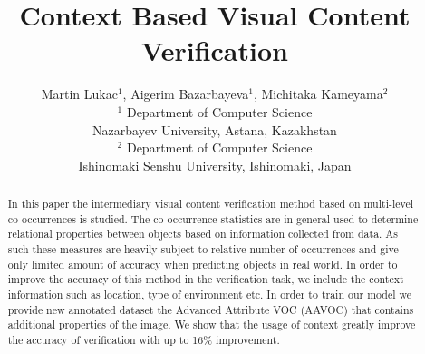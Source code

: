 \documentclass[conference]{IEEEtran}
\begin{document}
\title{Context Based Visual Content Verification}

\author{Martin Lukac$^1$, Aigerim Bazarbayeva$^1$, Michitaka Kameyama$^2$\\ 
$^1$ Department of Computer Science\\ Nazarbayev University, Astana, Kazakhstan\\
$^2$ Department of Computer Science\\ Ishinomaki Senshu University, Ishinomaki, Japan
}


\author{
\and
{}
\and
{}
}

\maketitle


\begin{abstract}
	In this paper the intermediary visual content verification method based on multi-level co-occurrences is studied. The co-occurrence statistics are in general used to determine relational properties between objects based on information collected from data. As such these measures are heavily subject to relative number of occurrences and give only limited amount of accuracy when predicting objects in real world. In order to improve the accuracy of this method in the verification task, we include the context information such as location, type of environment etc. In order to train our model we provide new annotated dataset the Advanced Attribute VOC (AAVOC) that contains additional properties of the image. We show that the usage of context greatly improve the accuracy of verification with up to 16\% improvement. 
\end{abstract}

\IEEEpeerreviewmaketitle
\end{document}
